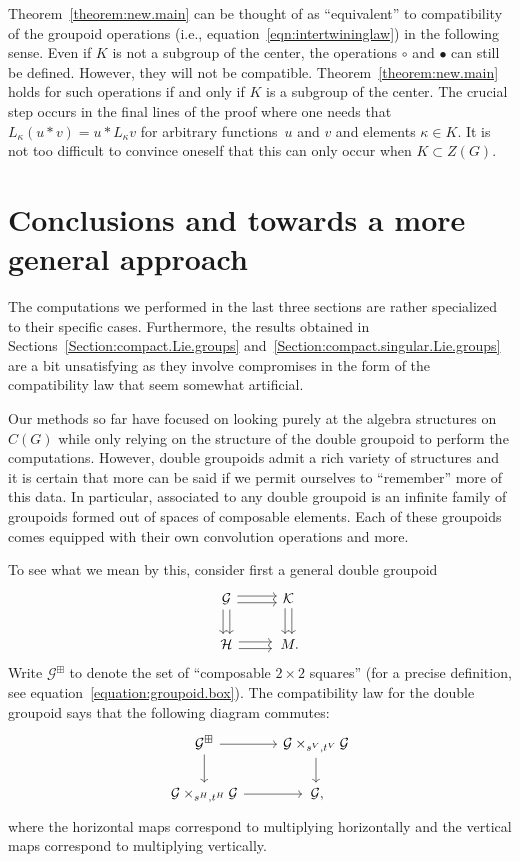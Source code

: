 \documentclass[10pt,a4paper]{amsart}
\numberwithin{equation}{section}
\theoremstyle{definition}
\newcommand{\CG}{\mathcal{G}}
\newcommand{\CH}{\mathcal{H}}
\newcommand{\CK}{\mathcal{K}}
\newcommand{\darrow}{\arrow[d, shift right] \arrow[d, shift left]}
\newcommand{\rarrow}{\arrow[r, shift right] \arrow[r, shift left]}
\begin{document}
   Theorem~\ref{theorem:new.main} can be thought of as ``equivalent'' to compatibility of the groupoid operations (i.e., equation~\eqref{eqn:intertwininglaw}) in the following sense. Even if $ K $ is not a subgroup of the center, the operations $ \circ $ and $ \bullet $ can still be defined. However, they will not be compatible. Theorem~\ref{theorem:new.main} holds for such operations if and only if $ K $ is a subgroup of the center. The crucial step occurs in the final lines of the proof where one needs that $ L_\kappa (u * v) = u * L_{\kappa} v $ for arbitrary functions~$ u $ and $ v $ and elements $ \kappa \in K $. It is not too difficult to convince oneself that this can only occur when $ K \subset Z(G) $.

\section{Conclusions and towards a more general approach}
The computations we performed in the last three sections are rather specialized to their specific cases. Furthermore, the results obtained in Sections~\ref{Section:compact.Lie.groups} and~\ref{Section:compact.singular.Lie.groups} are a bit unsatisfying as they involve compromises in the form of the compatibility law that seem somewhat artificial.

Our methods so far have focused on looking purely at the algebra structures on $ C(G) $ while only relying on the structure of the double groupoid to perform the computations. However, double groupoids admit a rich variety of structures and it is certain that more can be said if we permit ourselves to ``remember'' more of this data. In particular, associated to any double groupoid is an infinite family of groupoids formed out of spaces of composable elements. Each of these groupoids comes equipped with their own convolution operations and more.

To see what we mean by this, consider first a general double groupoid
 \begin{equation*}
  \begin{tikzcd}
\CG \darrow \rarrow & \CK \darrow \\
\CH \rarrow & \,M.
\end{tikzcd}
\end{equation*}
Write $ \CG^{\boxplus} $ to denote the set of ``composable $2\times 2$ squares'' (for a precise definition, see equation~\eqref{equation:groupoid.box}). The compatibility law for the double groupoid says that the following diagram commutes:
\[
\begin{tikzcd}
  \CG^\boxplus \arrow[r] \arrow[d] & \CG \times_{s^V,t^V} \CG \arrow[d] \\
  \CG \times_{s^H,t^H} \CG \arrow[r] &\,  \CG,
\end{tikzcd}
\]
where the horizontal maps correspond to multiplying horizontally and the vertical maps correspond to multiplying vertically.
\end{document}
